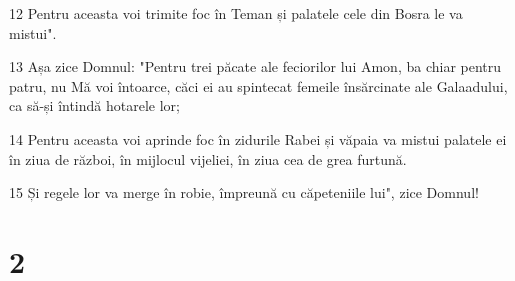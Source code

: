 \par 12 Pentru aceasta voi trimite foc în Teman și palatele cele din Bosra le va mistui".
\par 13 Așa zice Domnul: "Pentru trei păcate ale feciorilor lui Amon, ba chiar pentru patru, nu Mă voi întoarce, căci ei au spintecat femeile însărcinate ale Galaadului, ca să-și întindă hotarele lor;
\par 14 Pentru aceasta voi aprinde foc în zidurile Rabei și văpaia va mistui palatele ei în ziua de război, în mijlocul vijeliei, în ziua cea de grea furtună.
\par 15 Și regele lor va merge în robie, împreună cu căpeteniile lui", zice Domnul!

\chapter{2}

